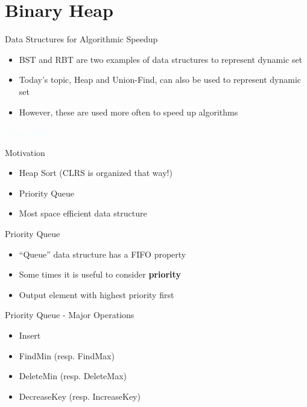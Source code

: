 \documentclass{beamer}
\newcommand{\thblue}[1]{{\Huge {\textcolor{azure}{#1}}}}
\begin{document}
\section{Binary Heap}

\begin{frame}{Data Structures for Algorithmic Speedup}
    \begin{itemize}
        \item BST and RBT are two examples of data structures to represent dynamic set
        \item Today's topic, Heap and Union-Find, can also be used to represent dynamic set
        \item However, these are used more often to speed up algorithms
    \end{itemize}
\end{frame}

\begin{frame}{}
    \begin{center}
        \thblue{Binary Heap}
    \end{center}
\end{frame}

\begin{frame}{Motivation}
    \begin{itemize}
        \item Heap Sort (CLRS is organized that way!)
        \item Priority Queue
        \item Most space efficient data structure
    \end{itemize}
\end{frame}

\begin{frame}{Priority Queue}
    \begin{itemize}
        \item ``Queue'' data structure has a FIFO property
        \item Some times it is useful to consider {\bf priority}
        \item Output element with highest priority first
    \end{itemize}
\end{frame}

\begin{frame}{Priority Queue - Major Operations}
    \begin{itemize}
        \item Insert
        \item FindMin (resp. FindMax)
        \item DeleteMin (resp. DeleteMax) 
        \item DecreaseKey (resp. IncreaseKey)
    \end{itemize}
\end{frame}
\end{document}
